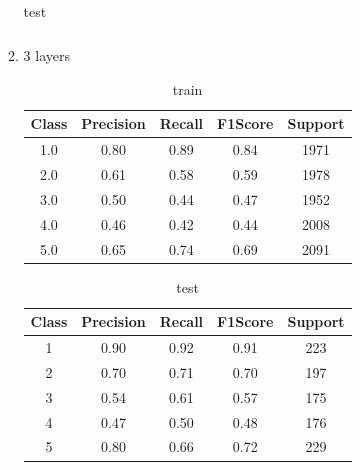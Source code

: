 \begin{enumerate}[label=(\alph*)]
\begin{enumerate}[label=\roman*.]
\begin{table}[!htb]
\begin{tabular}{ccccc}
                        \end{tabular}
                        \caption{test}
                        \label{part f test depth 2}
                    \end{table}
              \item 3 layers
                    \begin{table}[!htb]
                        \centering
                        \begin{tabular}{ccccc}
                            \hline
                            Class & Precision & Recall & F1Score & Support \\ \hline
                            1.0   & 0.80      & 0.89   & 0.84    & 1971    \\
                            2.0   & 0.61      & 0.58   & 0.59    & 1978    \\
                            3.0   & 0.50      & 0.44   & 0.47    & 1952    \\
                            4.0   & 0.46      & 0.42   & 0.44    & 2008    \\
                            5.0   & 0.65      & 0.74   & 0.69    & 2091    \\ \hline
                        \end{tabular}
                        \caption{train}
                        \label{part f train depth 3}
                    \end{table}
                    \begin{table}[!htb]
                        \centering
                        \begin{tabular}{ccccc}
                            \hline
                            Class & Precision & Recall & F1Score & Support \\ \hline
                            1     & 0.90      & 0.92   & 0.91    & 223     \\
                            2     & 0.70      & 0.71   & 0.70    & 197     \\
                            3     & 0.54      & 0.61   & 0.57    & 175     \\
                            4     & 0.47      & 0.50   & 0.48    & 176     \\
                            5     & 0.80      & 0.66   & 0.72    & 229     \\ \hline
                        \end{tabular}
                        \caption{test}

\end{table}
\end{enumerate}
\end{enumerate}
